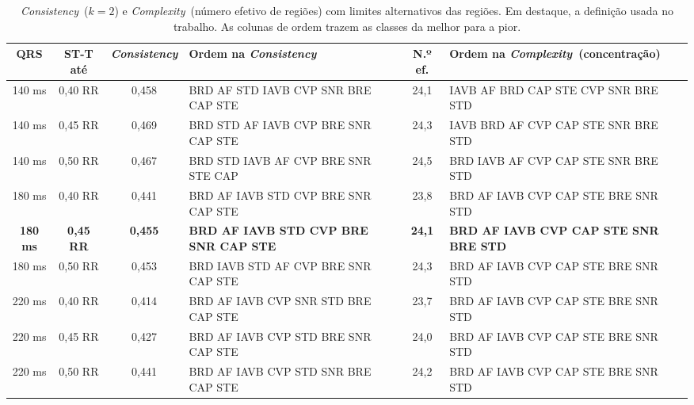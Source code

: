 \documentclass[11pt,a4paper]{article}
\newcommand{\fonte}[1]{\par\vspace{2pt}{\centering\footnotesize Fonte: #1\par}}
\newcommand{\CX}{\textit{Complexity}}
\newcommand{\CS}{\textit{Consistency}}
\begin{document}
\begin{table}[H]\centering\small
\caption{\CS\ ($k = 2$) e \CX\ (número efetivo de regiões) com limites alternativos das regiões. Em destaque, a definição usada no trabalho. As colunas de ordem trazem as classes da melhor para a pior.}\label{tab:robreg}
\footnotesize\setlength{\tabcolsep}{3pt}
\begin{tabular}{ccc>{\raggedright\arraybackslash}p{4.45cm}c>{\raggedright\arraybackslash}p{4.45cm}}
\toprule
\textbf{QRS} & \textbf{ST-T até} & \textbf{\CS} & \textbf{Ordem na \CS} & \textbf{N.º ef.} & \textbf{Ordem na \CX\ (concentração)} \\
\midrule
140 ms & 0,40 RR & 0,458 & BRD AF STD IAVB CVP SNR BRE CAP STE & 24,1 & IAVB AF BRD CAP STE CVP SNR BRE STD \\
140 ms & 0,45 RR & 0,469 & BRD STD AF IAVB CVP BRE SNR CAP STE & 24,3 & IAVB BRD AF CVP CAP STE SNR BRE STD \\
140 ms & 0,50 RR & 0,467 & BRD STD IAVB AF CVP BRE SNR STE CAP & 24,5 & BRD IAVB AF CVP CAP STE SNR BRE STD \\
180 ms & 0,40 RR & 0,441 & BRD AF IAVB STD CVP BRE SNR CAP STE & 23,8 & BRD AF IAVB CVP CAP STE BRE SNR STD \\
\textbf{180 ms} & \textbf{0,45 RR} & \textbf{0,455} & \textbf{BRD AF IAVB STD CVP BRE SNR CAP STE} & \textbf{24,1} & \textbf{BRD AF IAVB CVP CAP STE SNR BRE STD} \\
180 ms & 0,50 RR & 0,453 & BRD IAVB STD AF CVP BRE SNR CAP STE & 24,3 & BRD AF IAVB CVP CAP STE BRE SNR STD \\
220 ms & 0,40 RR & 0,414 & BRD AF IAVB CVP SNR STD BRE CAP STE & 23,7 & BRD AF IAVB CVP CAP STE BRE SNR STD \\
220 ms & 0,45 RR & 0,427 & BRD AF IAVB CVP STD BRE SNR CAP STE & 24,0 & BRD AF IAVB CVP CAP STE BRE SNR STD \\
220 ms & 0,50 RR & 0,441 & BRD AF IAVB CVP STD SNR BRE CAP STE & 24,2 & BRD AF IAVB CVP CAP STE BRE SNR STD \\
\bottomrule
\end{tabular}
\fonte{Dados do presente estudo.}
\end{table}
\end{document}

